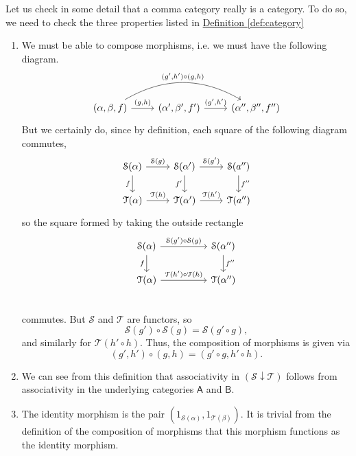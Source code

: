 \documentclass[a4paper,10pt]{scrreprt}
\theoremstyle{definition}
\theoremstyle{plain}
\theoremstyle{remark}
\begin{document}
Let us check in some detail that a comma category really is a category. To do so, we need to check the three properties listed in \hyperref[def:category]{Definition \ref*{def:category}}
\begin{enumerate}
  \item We must be able to compose morphisms, i.e. we must have the following diagram.
    \begin{equation*}
      \begin{tikzcd}
        {(\alpha, \beta, f)} \arrow[r, "{(g,h)}"] \arrow[rr, bend left, "{(g', h') \circ (g, h)}"] & {(\alpha', \beta', f')} \arrow[r, "{(g', h')}"] & {(\alpha'', \beta'', f'')}
      \end{tikzcd}
    \end{equation*}
    But we certainly do, since by definition, each square of the following diagram commutes,
    \begin{equation*}
      \begin{tikzcd}
        \mathcal{S}(\alpha) \arrow[r, "\mathcal{S}(g)"] \arrow[d, swap, "f"] & \mathcal{S}(\alpha') \arrow[r, "\mathcal{S}(g')"] \arrow[d, swap, "f'"] & \mathcal{S}(a'') \arrow[d, "f''"] \\
        \mathcal{T}(\alpha) \arrow[r, "\mathcal{T}(h)"] & \mathcal{T}(\alpha') \arrow[r, "\mathcal{T}(h')"] & \mathcal{T}(a'') 
      \end{tikzcd}
    \end{equation*}
    so the square formed by taking the outside rectangle
    \begin{equation*}
      \begin{tikzcd}[column sep=huge]
        \mathcal{S}(\alpha) \arrow[d, swap, "f"] \arrow[r, "\mathcal{S}(g') \circ \mathcal{S}(g)"] & \mathcal{S}(\alpha'') \arrow[d, "f''"] \\
        \mathcal{T}(\alpha) \arrow[r, "\mathcal{T}(h') \circ \mathcal{T}(h)"] & \mathcal{T}(\alpha'') \\
      \end{tikzcd}
    \end{equation*}
    commutes. But $\mathcal{S}$ and $\mathcal{T}$ are functors, so 
    \begin{equation*}
      \mathcal{S}(g') \circ \mathcal{S}(g) = \mathcal{S}(g' \circ g),
    \end{equation*}
    and similarly for $\mathcal{T}(h' \circ h)$. Thus, the composition of morphisms is given via
    \begin{equation*}
      (g', h') \circ (g,h) = (g'\circ g, h' \circ h).
    \end{equation*}

  \item We can see from this definition that associativity in $(\mathcal{S}\downarrow \mathcal{T})$ follows from associativity in the underlying categories $\mathsf{A}$ and $\mathsf{B}$.

  \item The identity morphism is the pair $(1_{\mathcal{S}(\alpha)}, 1_{\mathcal{T}(\beta)})$. It is trivial from the definition of the composition of morphisms that this morphism functions as the identity morphism.
\end{enumerate}
\end{document}
